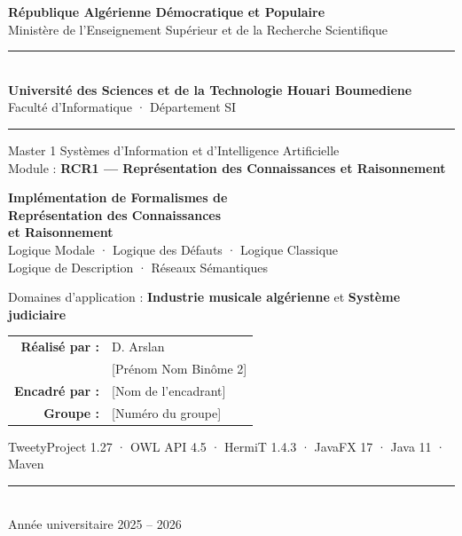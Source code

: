 \begin{titlepage}
\begin{center}

{\large\bfseries République Algérienne Démocratique et Populaire}\\[0.3em]
{\large Ministère de l'Enseignement Supérieur et de la Recherche Scientifique}\\[1.5em]

\rule{\linewidth}{0.6pt}\\[0.5em]
{\large\bfseries Université des Sciences et de la Technologie Houari Boumediene}\\
{\normalsize Faculté d'Informatique · Département SI}\\[0.3em]
\rule{\linewidth}{0.6pt}

\vspace{2em}

{\color{usthbblue}\large Master 1 Systèmes d'Information et d'Intelligence Artificielle}\\[0.5em]
{\normalsize Module : \textbf{RCR1 — Représentation des Connaissances et Raisonnement}}

\vspace{3em}

\begin{tcolorbox}[defbox, width=0.92\linewidth, halign=center]
  {\LARGE\bfseries Implémentation de Formalismes de}\\[0.4em]
  {\LARGE\bfseries Représentation des Connaissances}\\[0.4em]
  {\LARGE\bfseries et Raisonnement}\\[1em]
  {\large Logique Modale · Logique des Défauts · Logique Classique}\\
  {\large Logique de Description · Réseaux Sémantiques}
\end{tcolorbox}

\vspace{3em}

{\normalsize Domaines d'application :
  \textbf{Industrie musicale algérienne} et \textbf{Système judiciaire}}

\vspace{3em}

\begin{tabular}{rl}
  \textbf{Réalisé par :} & D. Arslan \\
                          & [Prénom Nom Binôme 2] \\[1em]
  \textbf{Encadré par :} & [Nom de l'encadrant] \\[1em]
  \textbf{Groupe :}      & [Numéro du groupe]
\end{tabular}

\vfill

{\small\color{gray}
  TweetyProject 1.27 · OWL API 4.5 · HermiT 1.4.3 · JavaFX 17 · Java 11 · Maven
}\\[1em]

\rule{\linewidth}{0.4pt}\\[0.4em]
{\normalsize Année universitaire 2025 -- 2026}

\end{center}
\end{titlepage}
